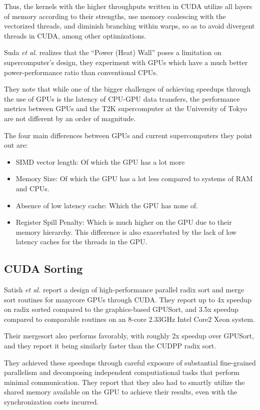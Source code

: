 Thus, the kernels with the higher throughputs written in CUDA utilize all layers of memory according to their strengths, use memory coalescing with the vectorized threads, and diminish branching within warps, so as to avoid divergent threads in CUDA, among other optimizations.

Suda \textit{et al.}\cite{Suda:2009:AGG:1509633.1509696} realizes that the ``Power (Heat) Wall'' poses a limitation on supercomputer's design, they experiment with GPUs which have a much better power-performance ratio than conventional CPUs.

They note that while one of the bigger challenges of achieving speedups through the use of GPUs is the latency of CPU-GPU data transfers, the performance metrics between GPUs and the T2K supercomputer at the University of Tokyo are not different by an order of magnitude.

The four main differences between GPUs and current supercomputers they point out are:
\begin{itemize}
	\item{SIMD vector length:}
	Of which the GPU has a lot more
	\item{Memory Size:}
	Of which the GPU has a lot less compared to systems of RAM and CPUs.
	\item{Absence of low latency cache:}
	Which the GPU has none of.
	\item{Register Spill Penalty:}
	Which is much higher on the GPU due to their memory hierarchy.
	This difference is also exacerbated by the lack of low latency caches for the threads in the GPU.
\end{itemize}

\subsection{CUDA Sorting}

Satish \textit{et al.}\cite{Satish:2009:DES:1586640.1587667} report a design of high-performance parallel radix sort and merge sort routines for manycore GPUs through CUDA.
They report up to 4x speedup on radix sorted compared to the graphics-based GPUSort, and 3.5x speedup compared to comparable routines on an 8-core 2.33GHz Intel Core2 Xeon system.

Their mergesort also performs favorably, with roughly 2x speedup over GPUSort, and they report it being similarly faster than the CUDPP radix sort.

They achieved these speedups through careful exposure of substantial fine-grained parallelism and decomposing independent computiational tasks that perform minimal communication.
They report that they also had to smartly utilize the shared memory available on the GPU to achieve their results, even with the synchronization costs incurred.

